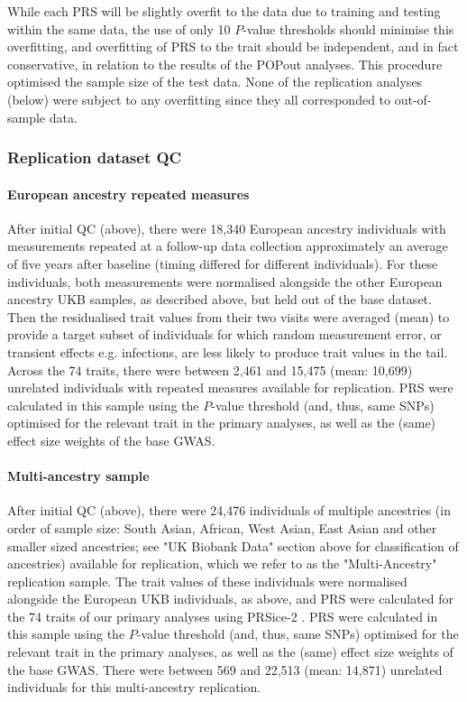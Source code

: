 \documentclass[12pt]{zHenriquesLab-StyleBioRxiv}
\begin{document}
{{While each PRS will be slightly overfit to the data due to training and testing within the same data, 
the use of only 10 $P$-value thresholds should minimise this overfitting, and overfitting of PRS 
to the trait should be independent, and in fact conservative, in relation to the results of 
the POPout analyses. This procedure optimised the sample size of the test data. None of the replication 
analyses (below) were subject to any overfitting since they all corresponded to out-of-sample data. 
%

\subsubsection*{Replication dataset QC} \label{sec:methods:rqc} 
\paragraph*{European ancestry repeated measures}
After initial QC (above), there were 18,340 European ancestry individuals 
with measurements repeated at a follow-up data collection approximately an average
of five years after baseline (timing differed for different individuals). For these individuals, both measurements were normalised alongside 
the other European ancestry UKB samples, as described above, but held out of the base dataset. Then 
the residualised trait values from their two visits were averaged (mean) to provide a 
target subset of individuals for which random measurement error, or transient 
effects e.g. infections, are less likely to produce trait values in the tail. 
Across the 74 traits, there were between 2,461 and 15,475 (mean: 10,699) unrelated 
individuals with repeated measures available for replication.  PRS were calculated in this sample 
using the $P$-value threshold (and, thus, same SNPs) optimised for the relevant 
trait in the primary analyses, as well as the (same) effect size weights of the base GWAS. 

\paragraph*{Multi-ancestry sample}
After initial QC (above), there were 24,476 individuals of multiple ancestries (in order of sample size: South Asian, African, West Asian, East Asian and other smaller sized ancestries; see "UK Biobank Data" section above for classification of ancestries) 
available for replication, which we refer to as the "Multi-Ancestry" replication sample. The trait values of 
these individuals were normalised alongside the European UKB individuals, as above, and PRS 
were calculated for the 74 traits of our primary analyses using PRSice-2 \cite{prsice}. 
PRS were calculated in this sample using the $P$-value threshold (and, thus, same SNPs) 
optimised for the relevant trait in the primary analyses, as well as the (same) effect 
size weights of the base GWAS. There were between 569 and 22,513 (mean: 14,871) unrelated 
individuals for this multi-ancestry replication. 

}}
\end{document}
